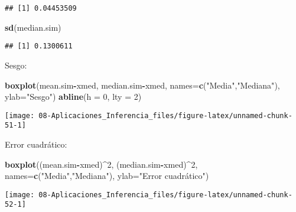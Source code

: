 \documentclass[
]{book}
\newenvironment{Shaded}{\begin{snugshade}}{\end{snugshade}}
\newcommand{\DataTypeTok}[1]{\textcolor[rgb]{0.13,0.29,0.53}{#1}}
\newcommand{\DecValTok}[1]{\textcolor[rgb]{0.00,0.00,0.81}{#1}}
\newcommand{\KeywordTok}[1]{\textcolor[rgb]{0.13,0.29,0.53}{\textbf{#1}}}
\newcommand{\NormalTok}[1]{#1}
\newcommand{\OperatorTok}[1]{\textcolor[rgb]{0.81,0.36,0.00}{\textbf{#1}}}
\newcommand{\StringTok}[1]{\textcolor[rgb]{0.31,0.60,0.02}{#1}}
\theoremstyle{break}
\theoremstyle{definition}
\theoremstyle{definition}
\theoremstyle{definition}
\theoremstyle{remark}
\begin{document}
\begin{enumerate}
\begin{verbatim}
## [1] 0.04453509
\end{verbatim}

\begin{Shaded}
\begin{Highlighting}[]
\KeywordTok{sd}\NormalTok{(median.sim)}
\end{Highlighting}
\end{Shaded}

\begin{verbatim}
## [1] 0.1300611
\end{verbatim}

  Sesgo:

\begin{Shaded}
\begin{Highlighting}[]
\KeywordTok{boxplot}\NormalTok{(mean.sim}\OperatorTok{-}\NormalTok{xmed, median.sim}\OperatorTok{-}\NormalTok{xmed, }
      \DataTypeTok{names=}\KeywordTok{c}\NormalTok{(}\StringTok{"Media"}\NormalTok{,}\StringTok{"Mediana"}\NormalTok{), }\DataTypeTok{ylab=}\StringTok{"Sesgo"}\NormalTok{)}
\KeywordTok{abline}\NormalTok{(}\DataTypeTok{h =} \DecValTok{0}\NormalTok{, }\DataTypeTok{lty =} \DecValTok{2}\NormalTok{)}
\end{Highlighting}
\end{Shaded}

  \begin{center}\texttt{[image: 08-Aplicaciones\_Inferencia\_files/figure-latex/unnamed-chunk-51-1]} \end{center}

  Error cuadrático:

\begin{Shaded}
\begin{Highlighting}[]
\KeywordTok{boxplot}\NormalTok{((mean.sim}\OperatorTok{-}\NormalTok{xmed)}\OperatorTok{^}\DecValTok{2}\NormalTok{, (median.sim}\OperatorTok{-}\NormalTok{xmed)}\OperatorTok{^}\DecValTok{2}\NormalTok{, }
      \DataTypeTok{names=}\KeywordTok{c}\NormalTok{(}\StringTok{"Media"}\NormalTok{,}\StringTok{"Mediana"}\NormalTok{), }\DataTypeTok{ylab=}\StringTok{"Error cuadrático"}\NormalTok{)}
\end{Highlighting}
\end{Shaded}

  \begin{center}\texttt{[image: 08-Aplicaciones\_Inferencia\_files/figure-latex/unnamed-chunk-52-1]} \end{center}


\end{enumerate}
\end{document}
